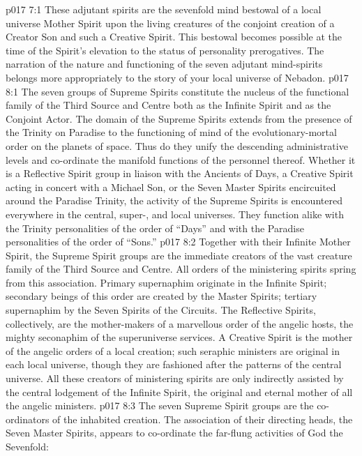 \vs p017 7:1 These adjutant spirits are the sevenfold mind bestowal of a local universe Mother Spirit upon the living creatures of the conjoint creation of a Creator Son and such a Creative Spirit. This bestowal becomes possible at the time of the Spirit’s elevation to the status of personality prerogatives. The narration of the nature and functioning of the seven adjutant mind\hyp{}spirits belongs more appropriately to the story of your local universe of Nebadon.
\vs p017 8:1 The seven groups of Supreme Spirits constitute the nucleus of the functional family of the Third Source and Centre both as the Infinite Spirit and as the Conjoint Actor. The domain of the Supreme Spirits extends from the presence of the Trinity on Paradise to the functioning of mind of the evolutionary\hyp{}mortal order on the planets of space. Thus do they unify the descending administrative levels and co\hyp{}ordinate the manifold functions of the personnel thereof. Whether it is a Reflective Spirit group in liaison with the Ancients of Days, a Creative Spirit acting in concert with a Michael Son, or the Seven Master Spirits encircuited around the Paradise Trinity, the activity of the Supreme Spirits is encountered everywhere in the central, super-, and local universes. They function alike with the Trinity personalities of the order of “Days” and with the Paradise personalities of the order of “Sons.”
\vs p017 8:2 \pc Together with their Infinite Mother Spirit, the Supreme Spirit groups are the immediate creators of the vast creature family of the Third Source and Centre. All orders of the ministering spirits spring from this association. Primary supernaphim originate in the Infinite Spirit; secondary beings of this order are created by the Master Spirits; tertiary supernaphim by the Seven Spirits of the Circuits. The Reflective Spirits, collectively, are the mother\hyp{}makers of a marvellous order of the angelic hosts, the mighty seconaphim of the superuniverse services. A Creative Spirit is the mother of the angelic orders of a local creation; such seraphic ministers are original in each local universe, though they are fashioned after the patterns of the central universe. All these creators of ministering spirits are only indirectly assisted by the central lodgement of the Infinite Spirit, the original and eternal mother of all the angelic ministers.
\vs p017 8:3 \pc The seven Supreme Spirit groups are the co\hyp{}ordinators of the inhabited creation. The association of their directing heads, the Seven Master Spirits, appears to co\hyp{}ordinate the far\hyp{}flung activities of God the Sevenfold:
